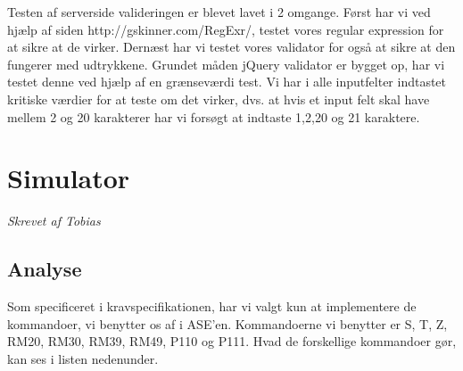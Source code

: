 \documentclass[a4paper]{article}
\begin{document}
Testen af serverside valideringen er blevet lavet i 2 omgange. Først har vi ved hjælp af siden http://gskinner.com/RegExr/, testet vores regular expression for at sikre at de virker. Dernæst har vi testet vores validator for også at sikre at den fungerer med udtrykkene. Grundet måden jQuery validator er bygget op, har vi testet denne ved hjælp af en grænseværdi test. Vi har i alle inputfelter indtastet kritiske værdier for at teste om det virker, dvs. at hvis et input felt skal have mellem 2 og 20 karakterer har vi forsøgt at indtaste 1,2,20 og 21 karaktere.  


\clearpage



\section{Simulator} %
\emph{Skrevet af Tobias}

\subsection{Analyse} %

Som specificeret i kravspecifikationen, har vi valgt kun at implementere de kommandoer, vi benytter os af i ASE’en. Kommandoerne vi benytter er S, T, Z, RM20, RM30, RM39, RM49, P110 og P111. Hvad de forskellige kommandoer gør, kan ses i listen nedenunder.
\end{document}

